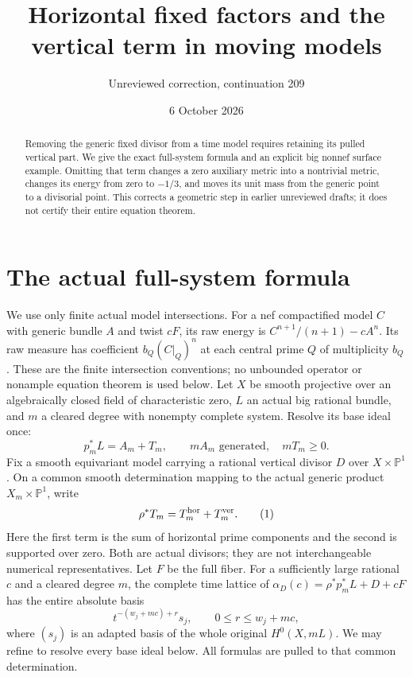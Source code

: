 \documentclass[11pt]{article}
\title{Horizontal fixed factors and the vertical term in moving models}
\author{Unreviewed correction, continuation 209}
\date{6 October 2026}
\begin{document}
\maketitle
\begin{abstract}
Removing the generic fixed divisor from a time model requires retaining
its pulled vertical part. We give the exact full-system formula and an
explicit big nonnef surface example. Omitting that term changes a zero
auxiliary metric into a nontrivial metric, changes its energy from zero
to $-1/3$, and moves its unit mass from the generic point to a divisorial
point. This corrects a geometric step in earlier unreviewed drafts; it
does not certify their entire equation theorem.
\end{abstract}

\section*{The actual full-system formula}
We use only finite actual model intersections. For a nef compactified
model $C$ with generic bundle $A$ and twist $cF$, its raw energy is
$C^{n+1}/(n+1)-cA^n$. Its raw measure has coefficient
$b_Q(C|_Q)^n$ at each central prime $Q$ of multiplicity $b_Q$.
These are the finite intersection conventions; no unbounded operator
or nonample equation theorem is used below.
Let $X$ be smooth projective over an algebraically closed field of
characteristic zero, $L$ an actual big rational bundle, and $m$ a cleared
degree with nonempty complete system. Resolve its base ideal once:
\[
 p_m^*L=A_m+T_m,\qquad mA_m\text{ generated},\quad mT_m\geq0.
\]
Fix a smooth equivariant model carrying a rational vertical divisor $D$
over $X\times\mathbb P^1$. On a common smooth determination mapping
to the actual generic product $X_m\times\mathbb P^1$, write
\[
 \rho^*T_m=T_m^{\rm hor}+T_m^{\rm ver}.
                                                        \tag{1}
\]
Here the first term is the sum of horizontal prime components and the
second is supported over zero. Both are actual divisors; they are not
interchangeable numerical representatives. Let $F$ be the full fiber.
For a sufficiently large rational $c$ and a cleared degree $m$, the
complete time lattice of $\alpha_D(c)=\rho^*p_m^*L+D+cF$ has the
entire absolute basis
\[
 t^{-(w_j+mc)+r}s_j,\qquad 0\leq r\leq w_j+mc,
                                                        \tag{2}
\]
where $(s_j)$ is an adapted basis of the whole original $H^0(X,mL)$.
We may refine to resolve every base ideal below. All formulas are pulled
to that common determination.
\end{document}
